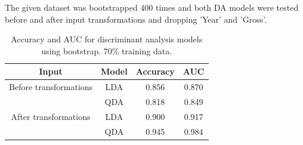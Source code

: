 \documentclass[../../project.tex]{subfiles}
\begin{document}
	The given dataset was bootstrapped 400 times and both DA models were tested before and after input transformations and dropping 'Year' and 'Gross'.
	\begin{table}[h!]
		\centering
		\caption{Accuracy and AUC for discriminant analysis models using bootstrap. 70\% training data.}
		\begin{tabular}{cccc}
		    \toprule
			Input & Model & Accuracy & AUC \\
			\midrule
			Before transformations
			& LDA & 0.856 & 0.870 \\
		    & QDA & 0.818 & 0.849 \\
			\midrule
			After transformations
			& LDA & 0.900 & 0.917 \\
			& QDA & 0.945 & 0.984 \\
			\bottomrule
		\end{tabular}
		
		\label{tab:discanal_table_70}
	\end{table}
\end{document}
